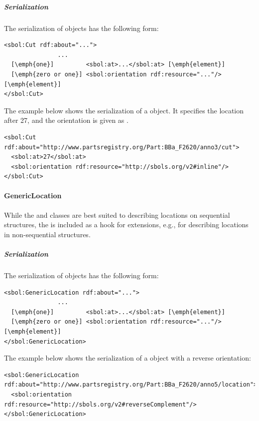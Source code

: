 \subparagraph{Serialization}

The serialization of  objects has the following form:
\begin{lstlisting}
<sbol:Cut rdf:about="...">
               ...   
  [\emph{one}]         <sbol:at>...</sbol:at> [\emph{element}] 
  [\emph{zero or one}] <sbol:orientation rdf:resource="..."/> [\emph{element}] 
</sbol:Cut>
\end{lstlisting}

The example below shows the serialization of a  object. It specifies the location after 27, and the orientation is given as .
\begin{lstlisting}
<sbol:Cut rdf:about="http://www.partsregistry.org/Part:BBa_F2620/anno3/cut">
  <sbol:at>27</sbol:at>
  <sbol:orientation rdf:resource="http://sbols.org/v2#inline"/>
</sbol:Cut>
\end{lstlisting}


\paragraph{GenericLocation}
\label{sec:GenericLocation}

While the  and  classes are best suited to
describing locations on sequential structures, the
 is included as a hook for extensions, e.g., for
describing locations in non-sequential structures.


\subparagraph{Serialization}

The serialization of  objects has the following form:
\begin{lstlisting}
<sbol:GenericLocation rdf:about="...">
               ...   
  [\emph{one}]         <sbol:at>...</sbol:at> [\emph{element}] 
  [\emph{zero or one}] <sbol:orientation rdf:resource="..."/> [\emph{element}] 
</sbol:GenericLocation>
\end{lstlisting}

The example below shows the serialization of a  object with a reverse orientation:
\begin{lstlisting}
<sbol:GenericLocation rdf:about="http://www.partsregistry.org/Part:BBa_F2620/anno5/location">
  <sbol:orientation rdf:resource="http://sbols.org/v2#reverseComplement"/>
</sbol:GenericLocation>
\end{lstlisting}

